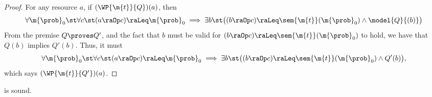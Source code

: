 \documentclass[acmsmall,nonacm,screen,appendix]{acmart}
\begin{document}
\begin{proof}
  For any resource $a$,
  if $(\WP {\m{t}} {Q})(a)$, then
  \[
    \forall \m{\prob}_0 \st
    \forall c \st
    (a \raOp c) \raLeq \m{\prob}_0
    \implies
    \exists b \st
    \bigl(
      (b \raOp c) \raLeq \sem{\m{t}}(\m{\prob}_0)
      \land
      \model{Q}{(b)}
    \bigr)
  \]
  From the premise $Q \proves Q'$, and the fact that $b$ must be valid for $ (b \raOp c) \raLeq \sem{\m{t}}(\m{\prob}_0) $ to hold, we have that $Q(b)$ implies $Q'(b)$.
  Thus, it must
  \[
    \forall \m{\prob}_0 \st
    \forall c \st
    (a \raOp c) \raLeq \m{\prob}_0
    \implies
    \exists b \st
    \bigl(
      (b \raOp c) \raLeq \sem{\m{t}}(\m{\prob}_0)
      \land
      Q'(b)
    \bigr),
  \]
  which says $(\WP {\m{t}} {Q'})(a)$.
\end{proof} \begin{lemma}
\label{proof:wp-frame}
   is sound.
\end{lemma}
\end{document}
